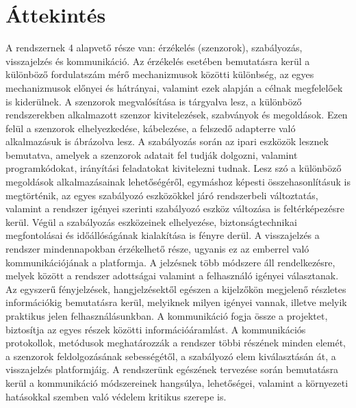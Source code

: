 \section{Áttekintés}

A rendszernek 4 alapvető része van: érzékelés (szenzorok), szabályozás, visszajelzés és kommunikáció.
Az érzékelés esetében bemutatásra kerül a különböző fordulatszám mérő mechanizmusok közötti különbség, az egyes mechanizmusok előnyei és hátrányai, valamint ezek alapján a célnak megfelelőek is kiderülnek. A szenzorok megvalósítása is tárgyalva lesz, a különböző rendszerekben alkalmazott szenzor kivitelezések, szabványok és megoldások. Ezen felül a szenzorok elhelyezkedése, kábelezése, a felszedő adapterre való alkalmazásuk is ábrázolva lesz.
A szabályozás során az ipari eszközök lesznek bemutatva, amelyek a szenzorok adatait fel tudják dolgozni, valamint programkódokat, irányítási feladatokat kivitelezni tudnak. Lesz szó a különböző megoldások alkalmazásainak lehetőségéről, egymáshoz képesti összehasonlításuk is megtörténik, az egyes szabályozó eszközökkel járó rendszerbeli változtatás, valamint a rendszer igényei szerinti szabályozó eszköz változása is feltérképezésre kerül. Végül a szabályozás eszközeinek elhelyezése, biztonságtechnikai megfontolásai és időállóságának kialakítása is fényre derül.
A visszajelzés a rendszer mindennapokban érzékelhető része, ugyanis ez az emberrel való kommunikációjának a platformja. A jelzésnek több módszere áll rendelkezésre, melyek között a rendszer adottságai valamint a felhasználó igényei választanak. Az egyszerű fényjelzések, hangjelzésektől egészen a kijelzőkön megjelenő részletes információkig bemutatásra kerül, melyiknek milyen igényei vannak, illetve melyik praktikus jelen felhasználásunkban.
A kommunikáció fogja össze a projektet, biztosítja az egyes részek közötti információáramlást. A kommunikációs protokollok, metódusok meghatározzák a rendszer többi részének minden elemét, a szenzorok feldolgozásának sebességétől, a szabályozó elem kiválasztásán át, a visszajelzés platformjáig. A rendszerünk egészének tervezése során bemutatásra kerül a kommunikáció módszereinek hangsúlya, lehetőségei, valamint a környezeti hatásokkal szemben való védelem kritikus szerepe is.
